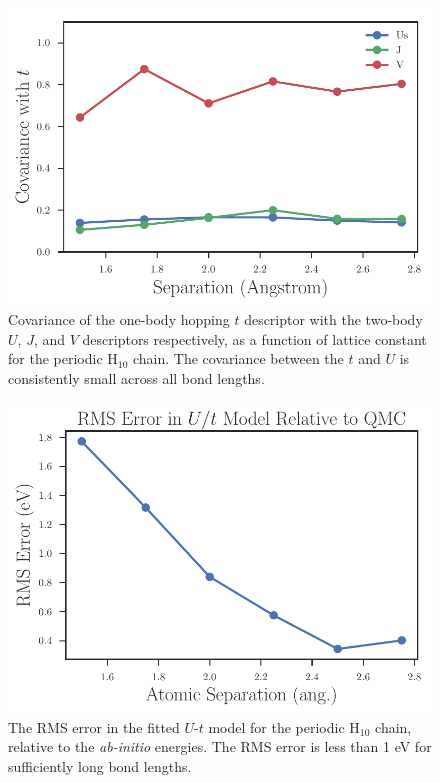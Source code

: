 \documentclass[prl,12pt,onecolumn,nofootinbib,notitlepage,english,superscriptaddress]{revtex4-1}
\begin{document}
 \begin{figure}
\centering
\includegraphics[scale=0.6]{t_covariance_vs_separation.pdf}
\caption{Covariance of the one-body hopping $t$ descriptor with the two-body $U$, $J$, and $V$ descriptors respectively, as a function of lattice constant for the periodic H$_{10}$ chain.  The covariance between the $t$ and $U$ is consistently small across all bond lengths.}\label{fig:Cov-of-Descriptors}
 \end{figure}
 
 \begin{figure}
\centering
\includegraphics[scale=0.6]{rms_ut_error_vs_separation_h_chain.pdf}
\caption{The RMS error in the fitted $U$-$t$ model for the periodic H$_{10}$ chain, relative to the \textit{ab-initio} energies. The RMS error is less than 1 eV for sufficiently long bond lengths.}\label{fig:RMS-Error-vs-Bond}
 \end{figure}
 
\end{document}
